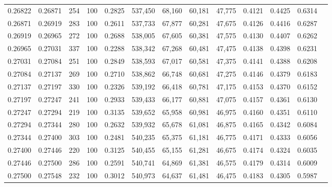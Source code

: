 \begin{tabular}{rrrrrrrrrrrrr}
0.26822 & 0.26871 &   254 & 100 &                                     0.2825 & 537,450 &  68,160 &  60,181 &  47,775 & 0.4121 & 0.4425 & 0.6314 \\
0.26871 & 0.26919 &   283 & 100 &                                     0.2611 & 537,733 &  67,877 &  60,281 &  47,675 & 0.4126 & 0.4416 & 0.6287 \\
0.26919 & 0.26965 &   272 & 100 &                                     0.2688 & 538,005 &  67,605 &  60,381 &  47,575 & 0.4130 & 0.4407 & 0.6262 \\
0.26965 & 0.27031 &   337 & 100 &                                     0.2288 & 538,342 &  67,268 &  60,481 &  47,475 & 0.4138 & 0.4398 & 0.6231 \\
0.27031 & 0.27084 &   251 & 100 &                                     0.2849 & 538,593 &  67,017 &  60,581 &  47,375 & 0.4141 & 0.4388 & 0.6208 \\
0.27084 & 0.27137 &   269 & 100 &                                     0.2710 & 538,862 &  66,748 &  60,681 &  47,275 & 0.4146 & 0.4379 & 0.6183 \\
0.27137 & 0.27197 &   330 & 100 &                                     0.2326 & 539,192 &  66,418 &  60,781 &  47,175 & 0.4153 & 0.4370 & 0.6152 \\
0.27197 & 0.27247 &   241 & 100 &                                     0.2933 & 539,433 &  66,177 &  60,881 &  47,075 & 0.4157 & 0.4361 & 0.6130 \\
0.27247 & 0.27294 &   219 & 100 &                                     0.3135 & 539,652 &  65,958 &  60,981 &  46,975 & 0.4160 & 0.4351 & 0.6110 \\
0.27294 & 0.27344 &   280 & 100 &                                     0.2632 & 539,932 &  65,678 &  61,081 &  46,875 & 0.4165 & 0.4342 & 0.6084 \\
0.27344 & 0.27400 &   303 & 100 &                                     0.2481 & 540,235 &  65,375 &  61,181 &  46,775 & 0.4171 & 0.4333 & 0.6056 \\
0.27400 & 0.27446 &   220 & 100 &                                     0.3125 & 540,455 &  65,155 &  61,281 &  46,675 & 0.4174 & 0.4324 & 0.6035 \\
0.27446 & 0.27500 &   286 & 100 &                                     0.2591 & 540,741 &  64,869 &  61,381 &  46,575 & 0.4179 & 0.4314 & 0.6009 \\
0.27500 & 0.27548 &   232 & 100 &                                     0.3012 & 540,973 &  64,637 &  61,481 &  46,475 & 0.4183 & 0.4305 & 0.5987 \\

\end{tabular}
